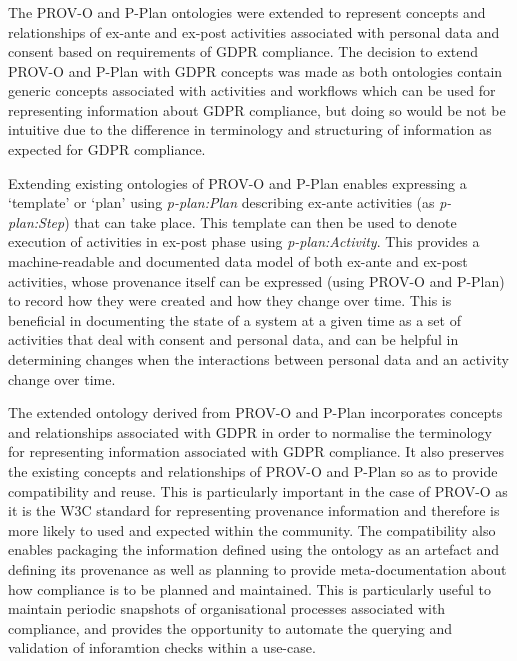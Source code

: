\subsubsection{}
The PROV-O and P-Plan ontologies were extended to represent concepts and relationships of ex-ante and ex-post activities associated with personal data and consent based on requirements of GDPR compliance.
The decision to extend PROV-O and P-Plan with GDPR concepts was made as both ontologies contain generic concepts associated with activities and workflows which can be used for representing information about GDPR compliance, but doing so would be not be intuitive due to the difference in terminology and structuring of information as expected for GDPR compliance.

Extending existing ontologies of PROV-O and P-Plan enables expressing a `template'
or `plan' using \textit{p-plan:Plan} describing ex-ante activities (as \textit{p-plan:Step}) that can take place. This template can then be used to denote execution of activities in ex-post phase using \textit{p-plan:Activity}.
This provides a machine-readable and documented data model of both ex-ante and ex-post activities, whose provenance itself can be expressed (using PROV-O and P-Plan) to record how they were created and how they  change over time.
This is beneficial in documenting the
state of a system at a given time as a set of activities that deal with consent and personal data, and
can be helpful in determining changes when the interactions between
personal data and an activity change over time.

The extended ontology derived from PROV-O and P-Plan incorporates concepts and relationships associated with GDPR in order to normalise the terminology for representing information associated with GDPR compliance.
It also preserves the existing concepts and relationships of PROV-O and P-Plan so as to provide compatibility and reuse. This is particularly important in the case of PROV-O as it is the W3C standard for representing provenance information and therefore is more likely to used and expected within the community.
The compatibility also enables packaging the information defined using the ontology as an artefact and defining its provenance as well as planning to provide meta-documentation about how compliance is to be planned and maintained. This is particularly useful to maintain periodic snapshots of organisational processes associated with compliance, and provides the opportunity to automate the querying and validation of inforamtion checks within a use-case.

